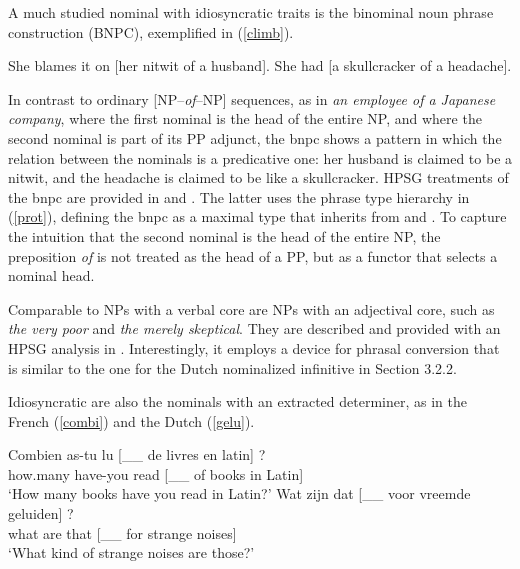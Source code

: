 \documentclass[output=paper]{langsci/langscibook}
\begin{document}
A much studied nominal with idiosyncratic traits is the binominal noun phrase 
construction (BNPC), exemplified in (\ref{climb}). 

\begin{exe}
\ex\label{climb}
\begin{xlist}
\ex  She blames it on [her nitwit of a husband]. 
\ex  She had [a skullcracker of a headache]. 
\end{xlist}
\end{exe}

\noindent
In contrast to ordinary [NP--\emph{of}--NP] sequences, 
as in \emph{an employee of a Japanese company}, where the 
first nominal is the head of the entire NP, and where the second 
nominal is part of its PP adjunct, the {\sc bnpc} shows a pattern
in which the relation between the nominals is a predicative one: 
her husband is claimed to be a nitwit, and the headache is claimed to be 
like a skullcracker. HPSG treatments of the {\sc bnpc} are provided in
\citet{KimSells14} and \citet{VanEynde18}. The latter uses 
the phrase type hierarchy in (\ref{prot}), defining the {\sc bnpc} as 
a maximal type that inherits from  and 
. To capture the intuition that the second
nominal is the head of the entire NP, the preposition \emph{of} is 
not treated as the head of a PP, but as a functor that selects 
a nominal head. 

Comparable to NPs with a verbal core are NPs with an adjectival core,
such as \emph{the very poor} and \emph{the merely skeptical}. They are  
described and provided with an HPSG analysis in \citet{ArnoldSpencer2015}.
Interestingly, it employs a device for phrasal conversion that is similar to 
the one for the Dutch nominalized infinitive in Section 3.2.2. 

Idiosyncratic are also the nominals with an extracted determiner, as in 
the French (\ref{combi}) and the Dutch (\ref{gelu}). 

\begin{exe} 
\ex\label{combi}  
\gll   Combien as-tu lu [\_\_ de livres en latin] ?    \\
       how.many have-you read [\_\_ of books in Latin] \\ 
\trans `How many books have you read in Latin?' 
\ex\label{gelu}
\gll   Wat zijn dat [\_\_ voor vreemde geluiden] ? \\
       what are that [\_\_ for strange noises]     \\ 
\trans `What kind of strange noises are those?'  
\end{exe} 
\end{document}
